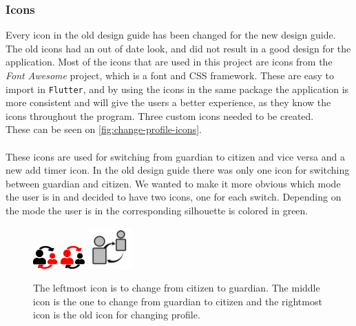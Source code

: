 \subsubsection{Icons}
Every icon in the old design guide has been changed for the new design guide.
The old icons had an out of date look, and did not result in a good design for the application.
Most of the icons that are used in this project are icons from the \textit{Font Awesome} project, which is a font and CSS framework.
These are easy to import in \texttt{Flutter}, and by using the icons in the same package the application is more consistent and will give the users a better experience, as they know the icons throughout the program.
Three custom icons needed to be created. \\
These can be seen on \autoref{fig:change-profile-icons}. \\\\
These icons are used for switching from guardian to citizen and vice versa and a new add timer icon.
In the old design guide there was only one icon for switching between guardian and citizen.
We wanted to make it more obvious which mode the user is in and decided to have two icons, one for each switch.
Depending on the mode the user is in the corresponding silhouette is colored in green.

\begin{figure}[htp]

    \centering
    \includegraphics[width=.1\textwidth]{figures/changeToGuardian}\hfill
    \includegraphics[width=.1\textwidth]{figures/changeToCitizen}\hfill
    \includegraphics[width=.1\textwidth]{figures/old-change-profile}
    
    \caption{ The leftmost icon is to change from citizen to guardian. The middle icon is the one to change from guardian to citizen and the rightmost icon is the old icon for changing profile.}
    \label{fig:change-profile-icons}
\end{figure}

